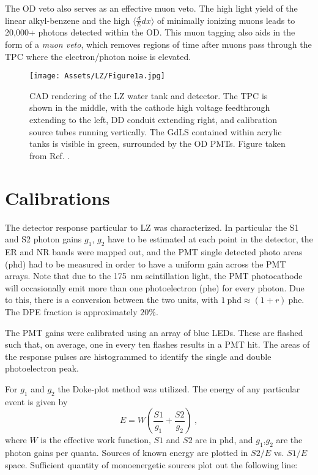 The OD veto also serves as an effective muon veto.
The high light yield of the linear alkyl-benzene and the high $\langle \frac dE dx \rangle$ of minimally ionizing muons leads to 20,000+ photons detected within the OD.
This muon tagging also aids in the form of a \textit{muon veto}, which removes regions of time after muons pass through the TPC where the electron/photon noise is elevated.

\begin{figure}
    \centering
    \texttt{[image: Assets/LZ/Figure1a.jpg]}
    \caption[  CAD rendering of the LZ water tank and detector.]%
    {
    CAD rendering of the LZ water tank and detector.
    The TPC is shown in the middle, with the cathode high voltage feedthrough extending to the left, DD conduit extending right, and calibration source tubes running vertically.
    The GdLS contained within acrylic tanks is visible in green, surrounded by the OD PMTs.
    Figure taken from Ref. \cite{akerib_projected_2020-1}.
    }
    \label{fig:lz_schematic}
\end{figure}

\section{Calibrations}

The detector response particular to LZ was characterized.
In particular the S1 and S2 photon gains $g_1$, $g_2$ have to be estimated at each point in the detector, the ER and NR bands were mapped out, and the PMT single detected photo areas (phd) had to be measured in order to have a uniform gain across the PMT arrays.
Note that due to the 175~nm scintillation light, the PMT photocathode will occasionally emit more than one photoelectron (phe)  for every photon\cite{faham_measurements_2015}.
Due to this, there is a conversion between the two units, with $1\mathrm{~phd} \approx (1+r) \mathrm {~phe}$.
The DPE fraction is approximately $20$\%.

The PMT gains were calibrated using an array of blue LEDs. 
These are flashed such that, on average, one in every ten flashes results in a PMT hit.
The areas of the response pulses are histogrammed to identify the single and double
photoelectron peak.

For $g_1$ and $g_2$ the Doke-plot method was utilized\cite{baudis_measurement_2021}.
The energy of any particular event is given by 
\begin{equation}
    E = W \left( \frac{S1}{g_1} + \frac{S2}{g_2} \right) ~,
\end{equation}
\noindent
where $W$ is the effective work function, $S1$ and $S2$ are in phd, and $g_1$,$g_2$ are the photon gains per quanta.
Sources of known energy are plotted in $S2/E$ vs. $S1/E$ space.
Sufficient quantity of monoenergetic sources plot out the following line: 

